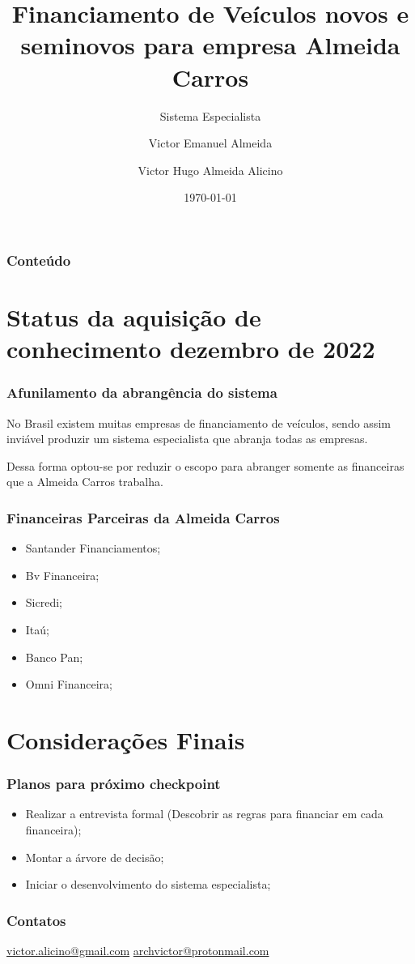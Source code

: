 \documentclass[12pt]{beamer}
\author[Victor * Almeida *]{Victor Emanuel Almeida \and Victor Hugo Almeida Alicino}
\title[Financiamento de veículos]{Financiamento de Veículos novos e seminovos para empresa Almeida Carros}
\subtitle{Sistema Especialista}
\date{\today}
\institute{UNIOESTE}
\begin{document}
\frame{\titlepage}

\begin{frame}
    \frametitle{Conteúdo}
    \tableofcontents
\end{frame}

\section{Status da aquisição de conhecimento dezembro de 2022}

\begin{frame}[allowframebreaks]
    \frametitle{Afunilamento da abrangência do sistema}

    No Brasil existem muitas empresas de financiamento de veículos,
    sendo assim inviável produzir um sistema especialista que abranja todas as empresas.

    \framebreak%

    Dessa forma optou-se por reduzir o escopo para abranger somente as financeiras que a Almeida Carros trabalha.
\end{frame}

\begin{frame}
    \frametitle{Financeiras Parceiras da Almeida Carros}

    \begin{itemize}
        \item Santander Financiamentos;
        \item Bv Financeira;
        \item Sicredi;
        \item Itaú;
        \item Banco Pan;
        \item Omni Financeira;
    \end{itemize}

\end{frame}

\section{Considerações Finais}
\begin{frame}
    \frametitle{Planos para próximo checkpoint}

    \begin{itemize}
        \item Realizar a entrevista formal (Descobrir as regras para financiar em cada financeira);
        \item Montar a árvore de decisão;
        \item Iniciar o desenvolvimento do sistema especialista;
    \end{itemize}

\end{frame}

\begin{frame}
    \frametitle{Contatos}
    \centering
    \url{victor.alicino@gmail.com}
    \url{archvictor@protonmail.com}
\end{frame}
\end{document}
